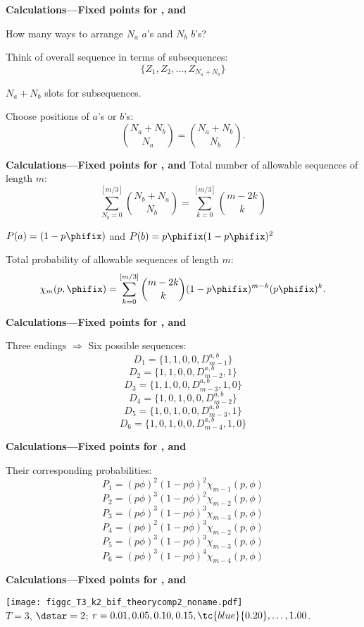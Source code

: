   \textbf{Calculations---Fixed points for , and }

  How many ways to arrange $N_a$ $a$'s and $N_b$ $b$'s?

  Think of overall sequence in terms of subsequences:
  $$ \{Z_1, Z_2, \ldots, Z_{N_a + N_b} \} $$

  $N_a + N_b$ slots for subsequences.

  Choose positions of $a$'s or $b$'s:
  $$
  \binom{N_a + N_b}{N_a} = \binom{N_a + N_b}{N_b}.
  $$


  \textbf{Calculations---Fixed points for , and }
  Total number of allowable sequences of length $m$:
  $$
  \sum_{N_b=0}^{[m/3]}
  \binom{N_b+N_a}{N_b}
  = 
  \sum_{k=0}^{[m/3]}
  \binom{m-2k}{k}
  $$

  $P(a) = (1-p\phifix)$ and $P(b) = p\phifix(1-p\phifix)^2$
  
  Total probability of allowable sequences of length $m$:
  $$
  \chi_m(p,\phifix)
  = 
  \sum_{k=0}^{[m/3]}
  \binom{m-2k}{k}
  (1-p\phifix)^{m-k}
  (p\phifix)^k.
  $$


  \textbf{Calculations---Fixed points for , and }

  Three endings $\Rightarrow$ Six possible sequences:
  $$ D_1 = \{1, 1, 0, 0, D_{m-1}^{a,b}\} $$
  $$ D_2 = \{1, 1, 0, 0, D_{m-2}^{a,b}, 1\} $$
  $$ D_3 = \{1, 1, 0, 0, D_{m-3}^{a,b}, 1, 0\}$$
  $$ D_4 = \{1, 0, 1, 0, 0, D_{m-2}^{a,b}\} $$
  $$ D_5 = \{1, 0, 1, 0, 0, D_{m-3}^{a,b}, 1\} $$
  $$ D_6 = \{1, 0, 1, 0, 0, D_{m-4}^{a,b}, 1, 0\} $$



  \textbf{Calculations---Fixed points for , and }

  Their corresponding probabilities:
  $$ P_1 = (p\phi)^2 (1-p\phi)^2 \chi_{m-1}(p,\phi) $$
  $$ P_2 = (p\phi)^3 (1-p\phi)^2 \chi_{m-2}(p,\phi) $$
  $$ P_3 = (p\phi)^3 (1-p\phi)^3 \chi_{m-3}(p,\phi) $$
  $$ P_4 = (p\phi)^2 (1-p\phi)^3 \chi_{m-2}(p,\phi) $$
  $$ P_5 = (p\phi)^3 (1-p\phi)^3 \chi_{m-3}(p,\phi) $$
  $$ P_6 = (p\phi)^3 (1-p\phi)^4 \chi_{m-4}(p,\phi) $$



  \textbf{Calculations---Fixed points for , and }

  \begin{center}
      \texttt{[image: figgc\_T3\_k2\_bif\_theorycomp2\_noname.pdf]}\\
      $T=3$, $\dstar=2$;
      \hfill
      $r=0.01, 0.05, 0.10, 0.15, \tc{blue}{0.20},\ldots, 1.00$.
  \end{center}

